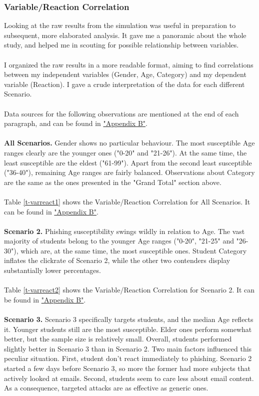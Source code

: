 \documentclass[a4paper]{article}
\begin{document}
\subsubsection{Variable/Reaction Correlation}

Looking at the raw results from the simulation was useful in preparation to subsequent, more elaborated analysis. It gave me a panoramic about the whole study, and helped me in scouting for possible relationship between variables. 
\\ \\
I organized the raw results in a more readable format, aiming to find correlations between my independent variables (Gender, Age, Category) and my dependent variable (Reaction). I gave a crude interpretation of the data for each different Scenario.
\\ \\
Data sources for the following observations are mentioned at the end of each paragraph, and can be found in \hyperlink{appendix-varreact}{"Appendix B"}.
\\ \\
\textbf{All Scenarios.} Gender shows no particular behaviour. The most susceptible Age ranges clearly are the younger ones ("0-20" and "21-26"). At the same time, the least susceptible are the eldest ("61-99"). Apart from the second least susceptible ("36-40"), remaining Age ranges are fairly balanced. Observations about Category are the same as the ones presented in the "Grand Total" section above.
\\ \\
Table \ref{t-varreact1} shows the Variable/Reaction Correlation for All Scenarios. It can be found in \hyperlink{appendix-varreact}{"Appendix B"}.
\\ \\
\textbf{Scenario 2.} Phishing susceptibility swings wildly in relation to Age. The vast majority of students belong to the younger Age ranges ("0-20", "21-25" and "26-30"), which are, at the same time, the most susceptible ones. Student Category inflates the clickrate of Scenario 2, while the other two contenders display substantially lower percentages.
\\ \\
Table \ref{t-varreact2} shows the Variable/Reaction Correlation for Scenario 2. It can be found in \hyperlink{appendix-varreact}{"Appendix B"}.
\\ \\
\textbf{Scenario 3.} Scenario 3 specifically targets students, and the median Age reflects it. Younger students still are the most susceptible. Elder ones perform somewhat better, but the sample size is relatively small. Overall, students performed slightly better in Scenario 3 than in Scenario 2. Two main factors influenced this peculiar situation. First, student don't react immediately to phishing. Scenario 2 started a few days before Scenario 3, so more the former had more subjects that actively looked at emails. Second, students seem to care less about email content. As a consequence, targeted attacks are as effective as generic ones.
\end{document}
